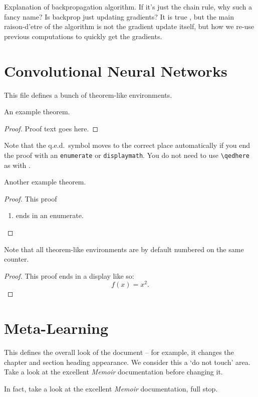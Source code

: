 Explanation of backpropagation algorithm. If it's just the chain rule, why such a fancy name? Is backprop just updating gradients? It is true , but the main raison-d'etre of the algorithm is not the gradient update itself, but how we re-use previous computations to quickly get the gradients.


\section{Convolutional Neural Networks}

This file defines a bunch of theorem-like environments.

\begin{theorem}
  An example theorem.
\end{theorem}

\begin{proof}
  Proof text goes here.
\end{proof}

Note that the q.e.d.\ symbol moves to the correct place automatically
if you end the proof with an \texttt{enumerate} or
\texttt{displaymath}.  You do not need to use \verb-\qedhere- as with
.

\begin{theorem}
  Another example theorem.
\end{theorem}

\begin{proof}
  This proof
  \begin{enumerate}
  \item ends in an enumerate.
  \end{enumerate}
\end{proof}

\begin{proposition}
  Note that all theorem-like environments are by default numbered on
  the same counter.
\end{proposition}

\begin{proof}
  This proof ends in a display like so:
  \begin{displaymath}
    f(x) = x^2.
  \end{displaymath}
\end{proof}

\section{Meta-Learning}

This defines the overall look of the document -- for example, it
changes the chapter and section heading appearance.  We consider this
a `do not touch' area.  Take a look at the excellent \emph{Memoir}
documentation before changing it.

In fact, take a look at the excellent \emph{Memoir} documentation,
full stop.



